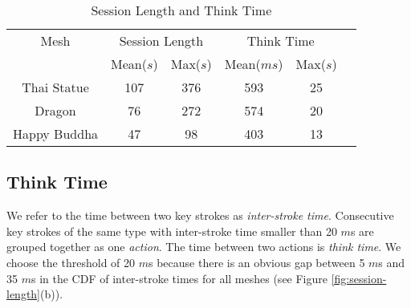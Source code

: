 
\begin{table}[hbp!]
\begin{center}
\begin{tabular}{|c|c|c|c|c|c|}
\hline 
Mesh&\multicolumn{2}{c|}{Session Length}&\multicolumn{2}{c|}{Think Time}\\
\cline{2-5}
&Mean($s$)&Max($s$)&Mean($ms$)&Max($s$)\\
\hline
Thai Statue&107&376&593&25\\
\hline
Dragon&76&272&574&20\\
\hline
Happy Buddha&47&98&403&13\\
\hline
\end{tabular}
\caption{Session Length and Think Time\label{t:TimeTable}}
\end{center}
\end{table}%

\subsection{Think Time}
\label{ss:user:thinktime}
We refer to the time between two key strokes as \textit{inter-stroke time}. 
Consecutive key strokes of the same type with inter-stroke time smaller than 20 $m$s
are grouped together as one \textit{action}. 
The time between two actions is \textit{think time}. 
We choose the threshold of 20 $m$s because there is an obvious gap between 5 $m$s and 35 $m$s
in the CDF of inter-stroke times for all meshes (see Figure \ref{fig:session-length}(b)).


